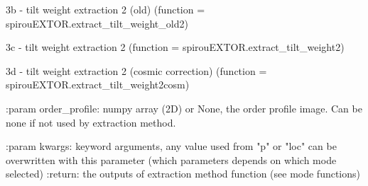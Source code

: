 \begin{minipage}{\textwidth}
\begin{pythondocstring}
        3b - tilt weight extraction 2 (old)
                (function = spirouEXTOR.extract_tilt_weight_old2)

        3c - tilt weight extraction 2
                (function = spirouEXTOR.extract_tilt_weight2)

        3d - tilt weight extraction 2 (cosmic correction)
                (function = spirouEXTOR.extract_tilt_weight2cosm)

:param order_profile: numpy array (2D) or None, the order profile image.
                      Can be none if not used by extraction method.

:param kwargs: keyword arguments, any value used from "p" or "loc" can be
               overwritten with this parameter (which parameters depends on
               which mode selected)
:return: the outputs of extraction method function (see mode functions)
\end{pythondocstring}
\end{minipage}


